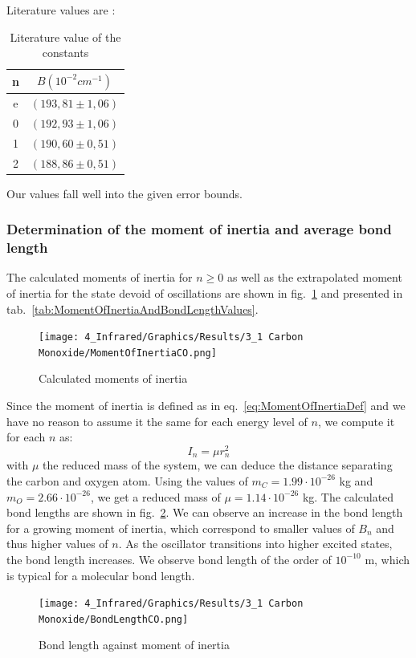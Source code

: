 \documentclass[12pt]{article}
\begin{document}
Literature values are \cite{doi:10.1021/ed073p804}:
\begin{table}[!ht]
    \centering
    \begin{tabular}{|c|c|}
    \hline
        n & $B (\si{10^{-2}cm^{-1}})$ \\ \hline \hline
        e & $(193,81 \pm 1,06)$ \\ \hline
        0 & $(192,93 \pm 1,06)$ \\ \hline
        1 & $(190,60 \pm 0,51)$ \\ \hline
        2 & $(188,86 \pm 0,51)$ \\ \hline
    \end{tabular}
    \caption{Literature value of the constants}
    \label{tab:BnLiteratureValues}
\end{table}
\FloatBarrier
Our values fall well into the given error bounds.

\subsubsection{Determination of the moment of inertia and average bond length}

The calculated moments of inertia for $n \geq 0$ as well as the extrapolated moment of inertia for the state devoid of oscillations are shown in fig.~\ref{fig:MomentsOfInertiaCO} and presented in tab.~\ref{tab:MomentOfInertiaAndBondLengthValues}.

\begin{figure}[!ht]
    \centering
    \texttt{[image: 4\_Infrared/Graphics/Results/3\_1 Carbon Monoxide/MomentOfInertiaCO.png]}
    \caption{Calculated moments of inertia}
    \label{fig:MomentsOfInertiaCO}
\end{figure}
\FloatBarrier

Since the moment of inertia is defined as in eq.~\ref{eq:MomentOfInertiaDef} and we have no reason to assume it the same for each energy level of $n$, we compute it for each $n$ as:
\begin{equation}
    I_n = \mu r_n^2
    \label{eq:MomentOfInertiaDef}
\end{equation}
with $\mu$ the reduced mass of the system, we can deduce the distance separating the carbon and oxygen atom.
Using the values of $m_C = 1.99 \cdot 10^{-26}$ kg and $m_O = 2.66 \cdot 10^{-26}$, we get a reduced mass of $\mu = 1.14 \cdot 10^{-26}$ kg. The calculated bond lengths are shown in fig.~\ref{fig:BondLengthCO}. We can observe an increase in the bond length for a growing moment of inertia, which correspond to smaller values of $B_n$ and thus higher values of $n$. As the oscillator transitions into higher excited states, the bond length increases. We observe bond length of the order of $10^{-10}$ m, which is typical for a molecular bond length. 
\begin{figure}[!ht]
    \centering
    \texttt{[image: 4\_Infrared/Graphics/Results/3\_1 Carbon Monoxide/BondLengthCO.png]}
    \caption{Bond length against moment of inertia}
    \label{fig:BondLengthCO}
\end{figure}
\FloatBarrier
\end{document}

